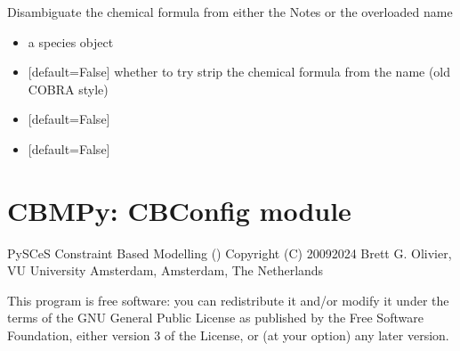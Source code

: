 \documentclass[letterpaper,10pt,english]{sphinxmanual}
\begin{document}
\begin{fulllineitems}
\label{\detokenize{modules_doc:cbmpy.CBCommon.processSpeciesChargeChemFormulaAnnot}}
\pysigstartsignatures
{}
\pysigstopsignatures
\sphinxAtStartPar
Disambiguate the chemical formula from either the Notes or the overloaded name
\begin{itemize}
\item {} 
\sphinxAtStartPar
{} a species object

\item {} 
\sphinxAtStartPar
{} {[}default=False{]} whether to try strip the chemical formula from the name (old COBRA style)

\item {} 
\sphinxAtStartPar
{} {[}default=False{]}

\item {} 
\sphinxAtStartPar
{} {[}default=False{]}

\end{itemize}

\end{fulllineitems}

\label{\detokenize{modules_doc:module-cbmpy.CBConfig}}

\section{CBMPy: CBConfig module}
\label{\detokenize{modules_doc:cbmpy-cbconfig-module}}
\sphinxAtStartPar
PySCeS Constraint Based Modelling ()
Copyright (C) 2009\sphinxhyphen{}2024 Brett G. Olivier, VU University Amsterdam, Amsterdam, The Netherlands

\sphinxAtStartPar
This program is free software: you can redistribute it and/or modify
it under the terms of the GNU General Public License as published by
the Free Software Foundation, either version 3 of the License, or
(at your option) any later version.
\end{document}
